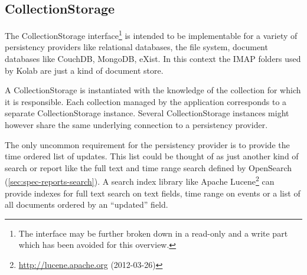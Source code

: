 \documentclass[11pt,a4paper,headsepline,twoside]{scrartcl}		%
\newcommand{\citeurl}[2]{\url{#1} (#2)}
\begin{document}



\subsection{CollectionStorage}
\label{sec:collectionstorage}

The CollectionStorage interface\footnote{The interface may be further broken
  down in a read-only and a write part which has been avoided for this
  overview.} is intended to be implementable for a variety of persistency
providers like relational databases, the file system, document databases like
CouchDB, MongoDB, eXist. In this context the IMAP folders used by Kolab are just
a kind of document store.

A CollectionStorage is instantiated with the knowledge of the collection for
which it is responsible. Each collection managed by the application corresponds
to a separate CollectionStorage instance. Several CollectionStorage instances
might however share the same underlying connection to a persistency provider.

The only uncommon requirement for the persistency provider is to provide the
time ordered list of updates. This list could be thought of as just another kind
of search or report like the full text and time range search defined by
OpenSearch (\autoref{sec:spec-reports-search}). A search index library like
Apache Lucene\footnote{\citeurl{http://lucene.apache.org}{2012-03-26}} can
provide indexes for full text search on text fields, time range on events or a
list of all documents ordered by an ``updated'' field.
\end{document}

